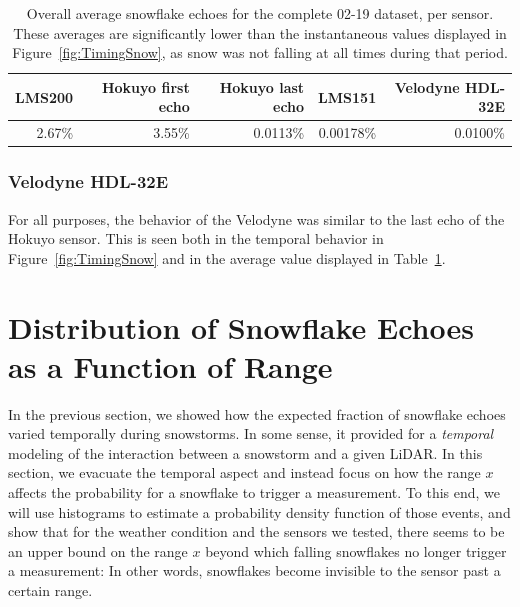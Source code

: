 \begin{table}[h]
    \centering
    \begin{tabular}{@{}rrrrr@{}}
        \toprule
        \textbf{LMS200} & \textbf{Hokuyo first echo}     & \textbf{Hokuyo last echo}    & \textbf{LMS151} & \textbf{Velodyne HDL-32E} \\
        \hline
        2.67\%          &           3.55\%    &       0.0113\%     &   0.00178\%     &  0.0100\%  \\
        \bottomrule
    \end{tabular}
    \caption{Overall average snowflake echoes for the complete 02-19 dataset, per sensor. These averages are significantly lower than the instantaneous values displayed in Figure~\ref{fig:TimingSnow}, as snow was not falling at all times during that period.}
    \label{tab:avgRates}
\end{table}

\subsubsection{Velodyne HDL-32E}
For all purposes, the behavior of the Velodyne was similar to the last echo of the Hokuyo sensor. This is seen both in the temporal behavior in Figure~\ref{fig:TimingSnow} and in the average value displayed in Table~\ref{tab:avgRates}.

\section{Distribution of Snowflake Echoes as a Function of Range}
\label{sec:chap_lidar_histo}

In the previous section, we showed how the expected fraction of snowflake echoes varied temporally during snowstorms. In some sense, it provided for a \emph{temporal} modeling of the interaction between a snowstorm and a given LiDAR. In this section, we evacuate the temporal aspect and instead focus on how the range $x$ affects the probability for a snowflake to trigger a measurement. To this end, we will use histograms to estimate a probability density function of those events, and show that for the weather condition and the sensors we tested, there seems to be an upper bound on the range $x$ beyond which falling snowflakes no longer trigger a measurement: In other words, snowflakes become invisible to the sensor past a certain range.

